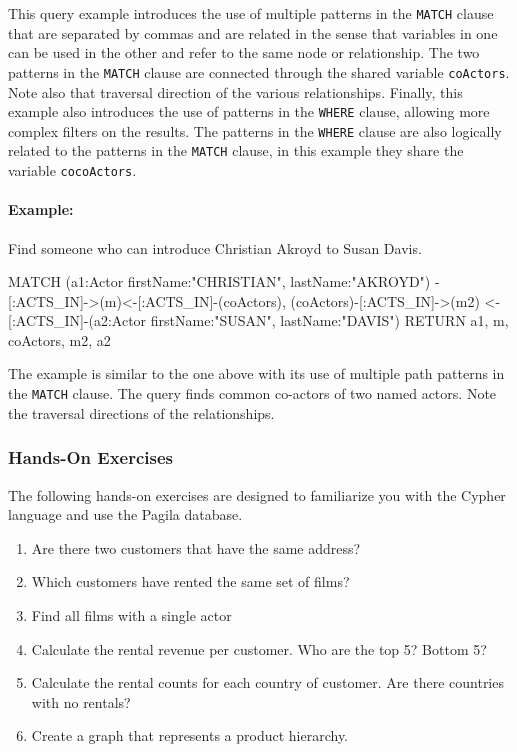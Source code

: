 This query example introduces the use of multiple patterns in the \texttt{MATCH} clause that are separated by commas and are related in the sense that variables in one can be used in the other and refer to the same node or relationship. The two patterns in the \texttt{MATCH} clause are connected through the shared variable \texttt{coActors}. Note also that traversal direction of the various relationships. Finally, this example also introduces the use of patterns in the \texttt{WHERE} clause, allowing more complex filters on the results. The patterns in the \texttt{WHERE} clause are also logically related to the patterns in the \texttt{MATCH} clause, in this example they share the variable \texttt{cocoActors}.

\paragraph*{Example:} Find someone who can introduce Christian Akroyd to Susan Davis.

\begin{cyphercode}
MATCH (a1:Actor {firstName:"CHRISTIAN", lastName:"AKROYD"})
        -[:ACTS_IN]->(m)<-[:ACTS_IN]-(coActors),
      (coActors)-[:ACTS_IN]->(m2)
        <-[:ACTS_IN]-(a2:Actor {firstName:"SUSAN", lastName:"DAVIS"})
RETURN a1, m, coActors, m2, a2
\end{cyphercode}

The example is similar to the one above with its use of multiple path patterns in the \texttt{MATCH} clause. The query finds common co-actors of two named actors. Note the traversal directions of the relationships.

\begin{tcolorbox}[colback=code]
\subsubsection*{Hands-On Exercises}

The following hands-on exercises are designed to familiarize you with the Cypher language and use the Pagila database.

\begin{enumerate}[nosep]
	\item Are there two customers that have the same address?
	\item Which customers have rented the same set of films?
	\item Find all films with a single actor
	\item Calculate the rental revenue per customer. Who are the top 5? Bottom 5?
	\item Calculate the rental counts for each country of customer. Are there countries with no rentals?
	\item Create a graph that represents a product hierarchy.
\end{enumerate}
\end{tcolorbox}

